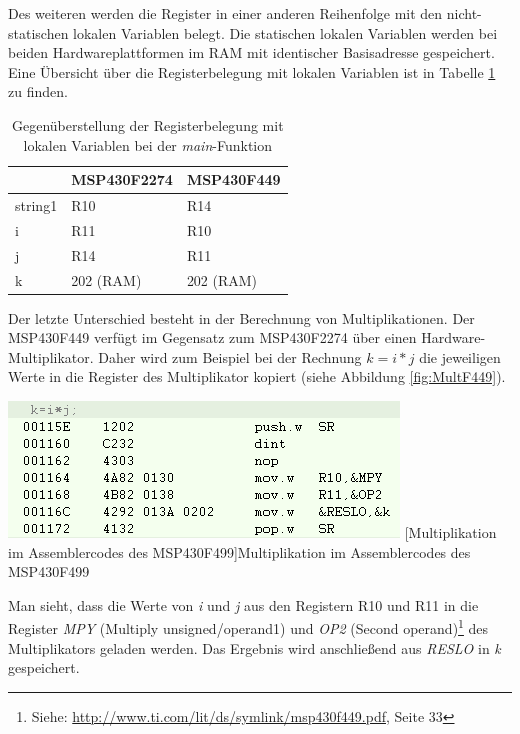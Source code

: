 \documentclass[12pt,a4paper,bibliography=totocnumbered,listof=totocnumbered]{scrartcl}
\begin{document}
Des weiteren werden die Register in einer anderen Reihenfolge mit den nicht-statischen lokalen Variablen belegt. Die statischen lokalen Variablen werden bei beiden Hardwareplattformen im RAM mit identischer Basisadresse gespeichert. Eine Übersicht über die Registerbelegung mit lokalen Variablen ist in Tabelle \ref{tab:Registerbelegung} zu finden.


\begin{table}[!h]
	\centering
	\begin{tabular}{|l|l|l|}
		\hline
		\textbf{} & \textbf{MSP430F2274} & \textbf{MSP430F449}\\
		\hline
		string1 & R10 & R14\\
		\hline
		i & R11 & R10\\
		\hline
		j & R14 & R11\\
		\hline
		k & 202 (RAM) & 202 (RAM)\\
		\hline
		
	\end{tabular}
	\caption{Gegenüberstellung der Registerbelegung mit lokalen Variablen bei der \textit{main}-Funktion}
	\label{tab:Registerbelegung}
\end{table}


Der letzte Unterschied besteht in der Berechnung von Multiplikationen. Der MSP430F449 verfügt im Gegensatz zum MSP430F2274 über einen Hardware-Multiplikator. Daher wird zum Beispiel bei der Rechnung \(k=i*j\) die jeweiligen Werte in die Register des Multiplikator kopiert (siehe Abbildung \ref{fig:MultF449}).

\vspace{1em}
\begin{minipage}{\linewidth}
	\centering
	\includegraphics[width=0.7\linewidth]{img/MultF449.png}
	[Multiplikation im Assemblercodes des MSP430F499]{Multiplikation im Assemblercodes des MSP430F499 }
	\label{fig:MultF449}
\end{minipage}

Man sieht, dass die Werte von \textit{i} und \textit{j} aus den Registern R10 und R11 in die Register \textit{MPY} (Multiply unsigned/operand1) und \textit{OP2} (Second operand)\footnote{Siehe: \url{http://www.ti.com/lit/ds/symlink/msp430f449.pdf}, Seite 33} des Multiplikators geladen werden. Das Ergebnis wird anschließend aus \textit{RESLO} in \textit{k} gespeichert.
\end{document}
